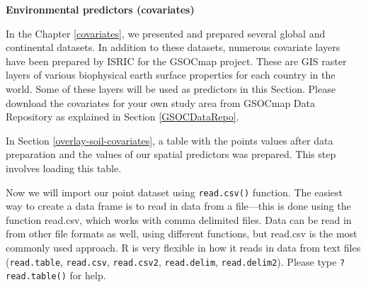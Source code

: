 \documentclass[10pt,b5paper,]{book}
\newenvironment{Shaded}{\begin{snugshade}}{\end{snugshade}}
\newcommand{\CommentTok}[1]{\textcolor[rgb]{0.56,0.35,0.01}{\textit{#1}}}
\newcommand{\KeywordTok}[1]{\textcolor[rgb]{0.13,0.29,0.53}{\textbf{#1}}}
\newcommand{\NormalTok}[1]{#1}
\newcommand{\OperatorTok}[1]{\textcolor[rgb]{0.81,0.36,0.00}{\textbf{#1}}}
\newcommand{\StringTok}[1]{\textcolor[rgb]{0.31,0.60,0.02}{#1}}
\theoremstyle{definition}
\theoremstyle{definition}
\theoremstyle{definition}
\theoremstyle{remark}
\begin{document}
\textbf{Environmental predictors (covariates)}

In the Chapter \ref{covariates}, we presented and prepared several
global and continental datasets. In addition to these datasets, numerous
covariate layers have been prepared by ISRIC for the GSOCmap project.
These are GIS raster layers of various biophysical earth surface
properties for each country in the world. Some of these layers will be
used as predictors in this Section. Please download the covariates for
your own study area from GSOCmap Data Repository as explained in Section
\ref{GSOCDataRepo}.

In Section \ref{overlay-soil-covariates}, a table with the points values
after data preparation and the values of our spatial predictors was
prepared. This step involves loading this table.

Now we will import our point dataset using \texttt{read.csv()} function.
The easiest way to create a data frame is to read in data from a
file---this is done using the function read.csv, which works with comma
delimited files. Data can be read in from other file formats as well,
using different functions, but read.csv is the most commonly used
approach. R is very flexible in how it reads in data from text files
(\texttt{read.table}, \texttt{read.csv}, \texttt{read.csv2},
\texttt{read.delim}, \texttt{read.delim2}). Please type
\texttt{?read.table()} for help.

\begin{Shaded}
\end{Shaded}
\end{document}
